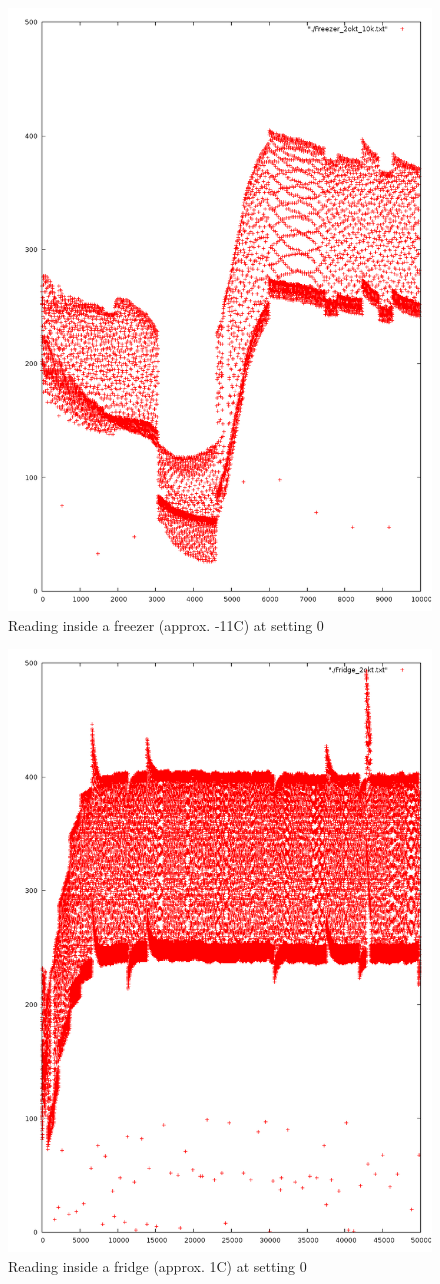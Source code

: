 \documentclass[a4paper]{article}           %
\begin{document}
\begin{figure}[H]
  \centering  
  \includegraphics[width=0.7\columnwidth]{img/Freezer10k.png}
  \caption{Reading inside a freezer (approx. -11C) at setting 0}
  \label{fig:ard1freezer}
\end{figure}
  
\begin{figure}[H]
  \centering  
  \includegraphics[width=0.7\columnwidth]{img/Fridge50k.png}
  \caption{Reading inside a fridge (approx. 1C) at setting 0}
  \label{fig:ard1fridge}
\end{figure}
\end{document}
